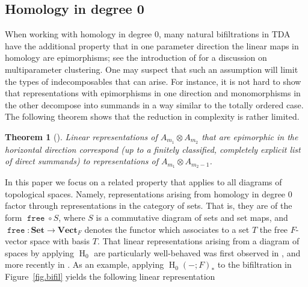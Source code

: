\documentclass[a4paper]{amsart}
\theoremstyle{plain}
\newtheorem{theorem}{Theorem}[section]
\theoremstyle{definition}
\theoremstyle{remark}
\newcommand{\funct}[1]{\operatorname{\mathtt{#1}}}
\newcommand{\Set}{\mathbf{Set}}
\newcommand{\VectF}{\mathbf{Vect}_F}
\begin{document}
\subsection{Homology in degree 0}
When working with homology in degree $0$, many natural bifiltrations in TDA have the additional property that in one parameter direction the linear maps in homology are epimorphisms; see the introduction of \cite{bauer2020cotorsion} for a discussion on multiparameter clustering. One may suspect that such an assumption will limit the types of indecomposables that can arise. For instance, it is not hard to show that representations with epimorphisms in one direction and monomorphisms in the other decompose into summands in a way similar to the totally ordered case. The following theorem shows that the reduction in complexity is rather limited. 
\begin{theorem}[\cite{bauer2020cotorsion}]
Linear representations of $A_{m_1}\otimes A_{m_2}$ that are epimorphic in the horizontal direction correspond (up to a finitely classified, completely explicit list of direct summands) to representations of $A_{m_1}\otimes A_{m_2-1}$. 
\end{theorem}  
In this paper we focus on a related property that applies to all diagrams of topological spaces. Namely, representations arising from homology in degree 0 factor through representations in the category of sets. That is, they are of the form $\funct{free} \circ S$, where $S$ is a commutative diagram of sets and set maps, and $\funct{free} \colon \Set \to \VectF$ denotes the functor which associates to a set $T$ the free $F$-vector space with basis $T$. That linear representations arising from a diagram of spaces by applying $\operatorname{H}_0$ are particularly well-behaved was first observed in \cite{chacholski2017combinatorial}, and more recently in \cites{brodzki2020complexity,cai2021elder,bauer2020cotorsion}. As an example, applying $\operatorname{H}_0(-;F)_*$ to the bifiltration in Figure~\ref{fig.bifil} yields the following linear representation
\end{document}
